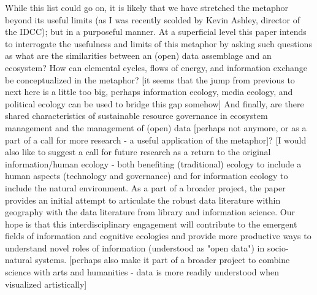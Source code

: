 While this list could go on, it is likely that we have stretched the metaphor beyond its useful limits (as I was recently scolded by Kevin Ashley, director of the IDCC); but in a purposeful manner. At a superficial level this paper intends to interrogate the usefulness and limits of this metaphor by asking such questions as what are the similarities between an (open) data assemblage and an ecosystem? How can elemental cycles, flows of energy, and information exchange be conceptualized in the metaphor? [it seems that the jump from previous to next here is a little too big, perhaps information ecology, media ecology, and political ecology can be used to bridge this gap somehow] And finally, are there shared characteristics of sustainable resource governance in ecosystem management and the management of (open) data [perhaps not anymore, or as a part of a call for more research - a useful application of the metaphor]? [I would also like to suggest a call for future research as a return to the original information/human ecology - both benefiting (traditional) ecology to include a human aspects (technology and governance) and for information ecology to include the natural environment. As a part of a broader project, the paper provides an initial attempt to articulate the robust data literature within geography with the data literature from library and information science. Our hope is that this interdisciplinary engagement will contribute to the emergent fields of information and cognitive ecologies and provide more productive ways to understand novel roles of information (understood as "open data") in socio-natural systems. [perhaps also make it part of a broader project to combine science with arts and humanities - data is more readily understood when visualized artistically]

